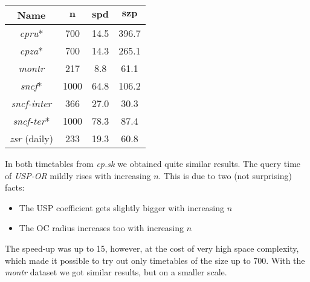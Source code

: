 		\begin{table}[H]
			\centering
			\begin{tabular}{c|c|c|c}
	            \rowcolor{tablehead}
	            \textbf{Name} & $\bm{n}$ & $\bm{spd}$ & $\bm{szp}$ \\
				\hline
				\textit{cpru}* & 700 & 14.5 & 396.7 \\
				\textit{cpza}* & 700 & 14.3 & 265.1 \\
				\textit{montr} & 217 & 8.8 & 61.1\\
				\textit{sncf}* & 1000 & 64.8 & 106.2 \\
				\textit{sncf-inter} & 366 & 27.0 & 30.3 \\
				\textit{sncf-ter}* & 1000 & 78.3 & 87.4 \\
				\textit{zsr} (daily) & 233 & 19.3 & 60.8 \\
			\end{tabular}
			\label{tab:uspor-speedup}
		\end{table}
	
		\noindent In both timetables from \textit{cp.sk} we obtained quite similar results. The query time of \textit{USP-OR} mildly rises with increasing $n$. This is due to two (not surprising) facts: 
		\begin{itemize}
			\item The USP coefficient gets slightly bigger with increasing $n$
			\item The OC radius increases too with increasing $n$
		\end{itemize}
		\hspace{\fill}
		
		\noindent The speed-up was up to 15, however, at the cost of very high space complexity, which made it possible to try out only timetables of the size up to 700. With the \textit{montr} dataset we got similar results, but on a smaller scale.
		
		\begin{figure}[H]
		\centering
		\end{figure}
		
